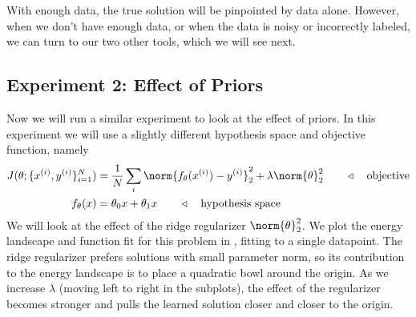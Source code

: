 With enough data, the true solution will be pinpointed by data alone. However, when we don't have enough data, or when the data is noisy or incorrectly labeled, we can turn to our two other tools, which we will see next.



\subsection{Experiment 2: Effect of Priors}

Now we will run a similar experiment to look at the effect of priors. In this experiment we will use a slightly different hypothesis space and objective function, namely
\begin{align}
    J(\theta; \{x^{(i)}, y^{(i)}\}^N_{i=1}) &= \frac{1}{N}\sum_i \norm{f_{\theta}(x^{(i)}) - y^{(i)}}_2^2 + \lambda \norm{\theta}_2^2 \quad\quad \triangleleft \quad\text{objective}\\
    f_{\theta}(x) &= \theta_0 x + \theta_1 x \quad\quad \triangleleft \quad\text{hypothesis space}
\end{align}
We will look at the effect of the ridge regularizer $\norm{\theta}_2^2$. We plot the energy landscape and function fit for this problem in \fig{\ref{fig:problem_of_generalization:more_regularizer_more_constraints}}, fitting to a single datapoint. The ridge regularizer prefers solutions with small parameter norm, so its contribution to the energy landscape is to place a quadratic bowl around the origin. As we increase $\lambda$ (moving left to right in the subplots), the effect of the regularizer becomes stronger and pulls the learned solution closer and closer to the origin.

